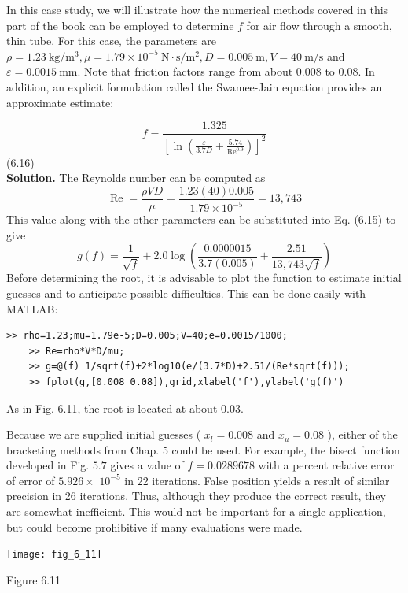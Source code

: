 \documentclass[../main.tex]{subfiles}
\begin{document}
In this case study, we will illustrate how the numerical methods covered in this part of the book can be employed to determine $f$ for air flow through a smooth, thin tube. For this case, the parameters are $\rho=1.23 \mathrm{~kg} / \mathrm{m}^{3}, \mu=1.79 \times 10^{-5} \mathrm{~N} \cdot \mathrm{s} / \mathrm{m}^{2}, D=0.005 \mathrm{~m}, V=40 \mathrm{~m} / \mathrm{s}$ and $\varepsilon=0.0015 \mathrm{~mm}$. Note that friction factors range from about $0.008$ to $0.08$. In addition, an explicit formulation called the Swamee-Jain equation provides an approximate estimate:
\bigskip

$$
f=\frac{1.325}{\left[\ln \left(\frac{\varepsilon}{3.7 D}+\frac{5.74}{\operatorname{Re}^{0.9}}\right)\right]^{2}}
$$\hfill (6.16)\\

\noindent\textbf{Solution.} The Reynolds number can be computed as
$$
\operatorname{Re}=\frac{\rho V D}{\mu}=\frac{1.23(40) 0.005}{1.79 \times 10^{-5}}=13,743
$$
This value along with the other parameters can be substituted into Eq. (6.15) to give
$$
g(f)=\frac{1}{\sqrt{f}}+2.0 \log \left(\frac{0.0000015}{3.7(0.005)}+\frac{2.51}{13,743 \sqrt{f}}\right)
$$
Before determining the root, it is advisable to plot the function to estimate initial guesses and to anticipate possible difficulties. This can be done easily with MATLAB:

\begin{lstlisting}[numbers=none,frame=none]
    >> rho=1.23;mu=1.79e-5;D=0.005;V=40;e=0.0015/1000;
    >> Re=rho*V*D/mu;
    >> g=@(f) 1/sqrt(f)+2*log10(e/(3.7*D)+2.51/(Re*sqrt(f)));
    >> fplot(g,[0.008 0.08]),grid,xlabel('f'),ylabel('g(f)')
\end{lstlisting}

As in Fig. 6.11, the root is located at about $0.03$.

Because we are supplied initial guesses ( $x_{l}=0.008$ and $x_{u}=0.08$ ), either of the bracketing methods from Chap. 5 could be used. For example, the bisect function developed in Fig. $5.7$ gives a value of $f=0.0289678$ with a percent relative error of error of $5.926 \times$ $10^{-5}$ in 22 iterations. False position yields a result of similar precision in 26 iterations. Thus, although they produce the correct result, they are somewhat inefficient. This would not be important for a single application, but could become prohibitive if many evaluations were made.

\begin{center}
	\texttt{[image: fig\_6\_11]}

	\textsf{Figure 6.11}
\end{center}
\end{document}
